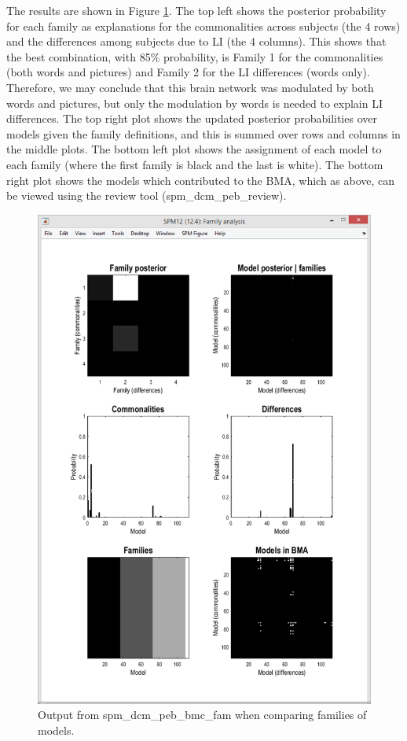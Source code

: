 \documentclass{article}
\begin{document}
The results are shown in Figure \ref{Fig_peb_family_analysis}. The top left shows the posterior probability for each family as explanations for the commonalities across subjects (the 4 rows) and the differences among subjects due to LI (the 4 columns). This shows that the best combination, with 85\% probability, is Family 1 for the commonalities (both words and pictures) and Family 2 for the LI differences (words only). Therefore, we may conclude that this brain network was modulated by both words and pictures, but only the modulation by words is needed to explain LI differences. The top right plot shows the updated posterior probabilities over models given the family definitions, and this is summed over rows and columns in the middle plots. The bottom left plot shows the assignment of each model to each family (where the first family is black and the last is white). The bottom right plot shows the models which contributed to the BMA, which as above, can be viewed using the review tool (spm\_dcm\_peb\_review).

\begin{figure}[ht]
\begin{center}
\includegraphics{"Fig_peb_family_analysis"}
\caption{Output from spm\_dcm\_peb\_bmc\_fam when comparing families of models.\label{Fig_peb_family_analysis}}
\end{center}
\end{figure}
\end{document}
